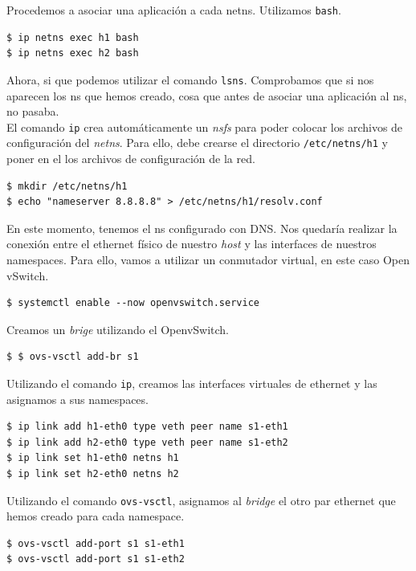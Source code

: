 \documentclass[a4paper, oneside, 12pt]{book}
\begin{document}
	\noindent Procedemos a asociar una aplicación a cada netns. Utilizamos \texttt{bash}.
	\begin{verbatim}
$ ip netns exec h1 bash
$ ip netns exec h2 bash
	\end{verbatim}

	\noindent Ahora, si que podemos utilizar el comando \texttt{lsns}. Comprobamos que si nos aparecen los ns que hemos creado, cosa que antes de asociar una aplicación al ns, no pasaba. \\
	
	\noindent El comando \texttt{ip} crea automáticamente un \textit{nsfs} para poder colocar los archivos de configuración del \textit{netns}. Para ello, debe crearse el directorio \texttt{/etc/netns/h1} y poner en el los archivos de configuración de la red.
	\begin{verbatim}
$ mkdir /etc/netns/h1
$ echo "nameserver 8.8.8.8" > /etc/netns/h1/resolv.conf
	\end{verbatim}

	\noindent En este momento, tenemos el ns configurado con DNS. Nos quedaría realizar la conexión entre el ethernet físico de nuestro \textit{host} y las interfaces de nuestros namespaces. Para ello, vamos a utilizar un conmutador virtual, en este caso Open vSwitch.
	\begin{verbatim}
$ systemctl enable --now openvswitch.service
	\end{verbatim}

	\noindent Creamos un \textit{brige} utilizando el OpenvSwitch.
	\begin{verbatim}
$ $ ovs-vsctl add-br s1
	\end{verbatim}

	\noindent Utilizando el comando \texttt{ip}, creamos las interfaces virtuales de ethernet y las asignamos a sus namespaces.
	\begin{verbatim}
$ ip link add h1-eth0 type veth peer name s1-eth1
$ ip link add h2-eth0 type veth peer name s1-eth2
$ ip link set h1-eth0 netns h1
$ ip link set h2-eth0 netns h2
	\end{verbatim}

	\pagebreak
	
	\noindent Utilizando el comando \texttt{ovs-vsctl}, asignamos al \textit{bridge} el otro par ethernet que hemos creado para cada namespace.
	\begin{verbatim}
$ ovs-vsctl add-port s1 s1-eth1
$ ovs-vsctl add-port s1 s1-eth2
	\end{verbatim}
\end{document}
